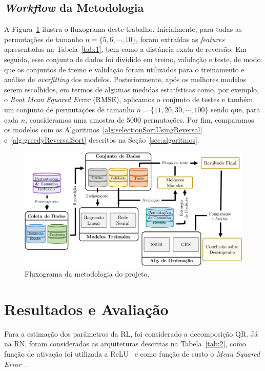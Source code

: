 \documentclass[runningheads,a4paper]{llncs}
\begin{document}
\subsection{\textit{Workflow} da Metodologia}

A Figura~\ref{fig:workflow} ilustra o fluxograma deste trabalho. Inicialmente, para todas as permutações de tamanho $n=\{5,6,\cdots,10\}$, foram  extraídas as \textit{features} apresentadas na Tabela~\ref{tab:1}, bem como a distância exata de reversão. Em seguida, esse conjunto de dados foi dividido em treino, validação e teste, de modo que os conjuntos de treino e validação foram utilizados para o treinamento e análise de \textit{overfitting} dos modelos. Posteriormente, após os melhores modelos serem escolhidos, em termos de algumas medidas estatísticas como, por exemplo, o \textit{Root Mean Squared Error} (RMSE), aplicamos o conjunto de testes e também um conjunto de permutações de tamanho $n=\{11,20,30,\cdots,100\}$ sendo que, para cada $n$, consideramos uma amostra de 5000 permutações. Por fim, comparamos os modelos com os Algoritmos~\ref{alg:selectionSortUsingReversal} e~\ref{alg:greedyReversalSort} descritos na Seção~\ref{sec:algoritmos}.

\begin{figure}[H]
	\centering
	\includegraphics[width=1\textwidth]{workflow.pdf}
	\caption{Fluxograma da metodologia do projeto.}
	\label{fig:workflow}
\end{figure}

\section{Resultados e Avaliação}
\label{sec:resultados}

Para a estimação dos parâmetros da RL, foi considerado a decomposição QR. Já na RN, foram consideradas as arquiteturas descritas na Tabela~\ref{tab:2}, como função de ativação foi utilizada a ReLU~\cite{Bishop} e como função de custo o \textit{Mean Squared Error}~\cite{Neter}.  
\end{document}

